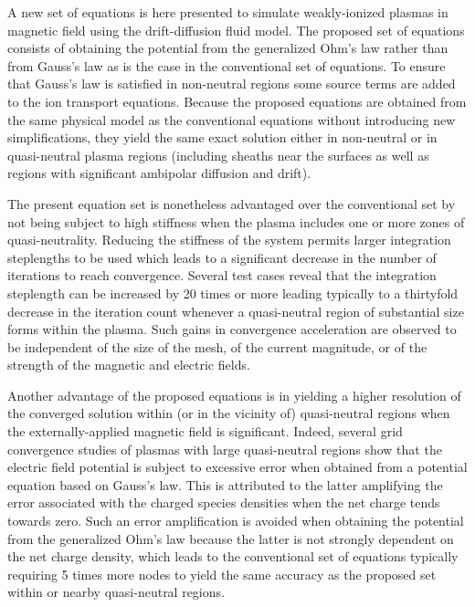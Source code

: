 \documentclass[twoside,onecolumn,10pt]{waflarticle}
\begin{document}
A new set of equations is here presented to simulate weakly-ionized plasmas in magnetic field using the drift-diffusion fluid model. The proposed set of equations consists of obtaining the potential from the generalized Ohm's law rather than from Gauss's law as is the case in the conventional set of equations. To ensure that Gauss's law is satisfied in non-neutral regions some source terms are added to the ion transport equations. Because the proposed equations are obtained from the same physical model as the conventional equations without introducing new simplifications, they yield the same exact solution either in non-neutral or in quasi-neutral plasma regions (including sheaths near the surfaces as well as regions with significant ambipolar diffusion and drift). 

The present equation set is nonetheless advantaged over the conventional set by not being subject to high stiffness when the plasma includes one or more zones of quasi-neutrality. Reducing the stiffness of the system permits larger integration steplengths to be used which leads to a significant decrease in the number of iterations to reach convergence. Several test cases reveal that the integration steplength can be increased by 20 times or more leading typically to a thirtyfold decrease in  the iteration count whenever a quasi-neutral region of substantial size forms within the plasma. Such gains in convergence acceleration are observed to be independent of the size of the mesh, of the current magnitude, or of the strength of the magnetic and  electric fields.  

Another advantage of the proposed equations is in yielding a higher resolution of the converged solution within (or in the vicinity of) quasi-neutral regions when the externally-applied magnetic field is significant. Indeed, several grid convergence studies of plasmas  with large quasi-neutral regions show that the electric field potential is subject to excessive error when obtained from a potential equation based on Gauss's law. This is attributed to the latter amplifying the error associated with the charged species densities when the net charge tends towards zero. Such an error amplification is avoided when obtaining the potential from the generalized Ohm's law because the latter is not strongly dependent on the net charge density, which leads to the conventional set of equations typically requiring 5 times more nodes to yield the same accuracy as the proposed set within or nearby quasi-neutral regions.    
\end{document}
